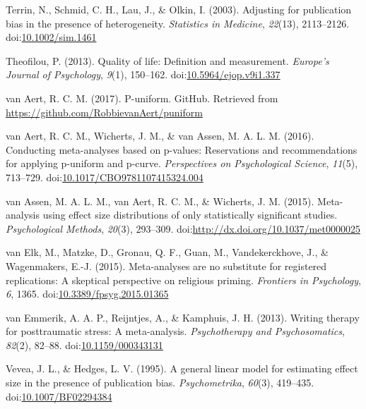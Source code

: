 \documentclass[,man]{apa6}
\begin{document}
\leavevmode\hypertarget{ref-Terrin2003}{}%
Terrin, N., Schmid, C. H., Lau, J., \& Olkin, I. (2003). Adjusting for publication bias in the presence of heterogeneity. \emph{Statistics in Medicine}, \emph{22}(13), 2113--2126. doi:\href{https://doi.org/10.1002/sim.1461}{10.1002/sim.1461}

\leavevmode\hypertarget{ref-Theofilou2013}{}%
Theofilou, P. (2013). Quality of life: Definition and measurement. \emph{Europe's Journal of Psychology}, \emph{9}(1), 150--162. doi:\href{https://doi.org/10.5964/ejop.v9i1.337}{10.5964/ejop.v9i1.337}

\leavevmode\hypertarget{ref-VanAert2017}{}%
van Aert, R. C. M. (2017). P-uniform. GitHub. Retrieved from \url{https://github.com/RobbievanAert/puniform}

\leavevmode\hypertarget{ref-VanAert2016}{}%
van Aert, R. C. M., Wicherts, J. M., \& van Assen, M. A. L. M. (2016). Conducting meta-analyses based on p-values: Reservations and recommendations for applying p-uniform and p-curve. \emph{Perspectives on Psychological Science}, \emph{11}(5), 713--729. doi:\href{https://doi.org/10.1017/CBO9781107415324.004}{10.1017/CBO9781107415324.004}

\leavevmode\hypertarget{ref-VanAssen2015}{}%
van Assen, M. A. L. M., van Aert, R. C. M., \& Wicherts, J. M. (2015). Meta-analysis using effect size distributions of only statistically significant studies. \emph{Psychological Methods}, \emph{20}(3), 293--309. doi:\href{https://doi.org/http://dx.doi.org/10.1037/met0000025}{http://dx.doi.org/10.1037/met0000025}

\leavevmode\hypertarget{ref-VanElk2015}{}%
van Elk, M., Matzke, D., Gronau, Q. F., Guan, M., Vandekerckhove, J., \& Wagenmakers, E.-J. (2015). Meta-analyses are no substitute for registered replications: A skeptical perspective on religious priming. \emph{Frontiers in Psychology}, \emph{6}, 1365. doi:\href{https://doi.org/10.3389/fpsyg.2015.01365}{10.3389/fpsyg.2015.01365}

\leavevmode\hypertarget{ref-VanEmmerik2013}{}%
van Emmerik, A. A. P., Reijntjes, A., \& Kamphuis, J. H. (2013). Writing therapy for posttraumatic stress: A meta-analysis. \emph{Psychotherapy and Psychosomatics}, \emph{82}(2), 82--88. doi:\href{https://doi.org/10.1159/000343131}{10.1159/000343131}

\leavevmode\hypertarget{ref-Vevea1995}{}%
Vevea, J. L., \& Hedges, L. V. (1995). A general linear model for estimating effect size in the presence of publication bias. \emph{Psychometrika}, \emph{60}(3), 419--435. doi:\href{https://doi.org/10.1007/BF02294384}{10.1007/BF02294384}
\end{document}

